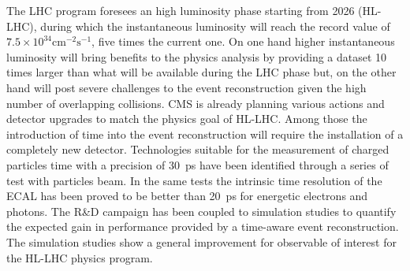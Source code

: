 The LHC program foresees an high luminosity phase starting from 2026 (HL-LHC), during which the
instantaneous luminosity will reach the record value of $7.5\times10^{34}\mbox{cm}^{-2}\mbox{s}^{-1}$, five times
the current one. On one hand higher instantaneous luminosity will bring benefits to the physics analysis by providing
a dataset 10 times larger than what will be available during the LHC phase but, on the other hand will post severe
challenges to the event reconstruction given the high number of overlapping collisions.
CMS is already planning various actions and detector upgrades to match the physics goal of HL-LHC.
Among those the introduction of time into the event reconstruction will require the installation of
a completely new detector. Technologies suitable for the measurement of charged particles time with a precision
of 30~ps have been identified through a series of test with particles beam. In the same tests the intrinsic time
resolution of the ECAL has been proved to be better than 20~ps for energetic electrons and photons.
The R\&D campaign has been coupled to simulation studies to quantify the expected gain in performance provided 
by a time-aware event reconstruction. The simulation studies show a general improvement for observable of interest for
the HL-LHC physics program.
